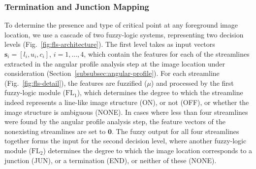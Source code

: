 \documentclass[twocolumn,natbib]{svjour3}
\begin{document}
\subsubsection{Termination and Junction Mapping}
\label{sec:cp-detection}
To determine the presence and type of critical point at any foreground image location, we use a cascade of two fuzzy-logic systems, representing two decision levels (Fig.~\ref{fig:fls-architecture}). The first level takes as input vectors $\mathbf{s}_{i}=[l_{i},u_{i},c_{i}]$, $i=1,\dots,4$, which contain the features for each of the streamlines extracted in the angular profile analysis step at the image location under consideration (Section~\ref{subsubsec:angular-profile}). For each streamline (Fig.~\ref{fig:fls-detail}), the features are fuzzified ($\mu$) and processed by the first fuzzy-logic module ($\textrm{FL}_{1}$), which determines the degree to which the streamline indeed represents a line-like image structure (ON), or not (OFF), or whether the image structure is ambiguous (NONE). In cases where less than four streamlines were found by the angular profile analysis step, the feature vectors of the nonexisting streamlines are set to $\mathbf{0}$. The fuzzy output for all four streamlines together forms the input for the second decision level, where another fuzzy-logic module ($\textrm{FL}_{2}$) determines the degree to which the image location corresponds to a junction (JUN), or a termination (END), or neither of these (NONE).
\end{document}
